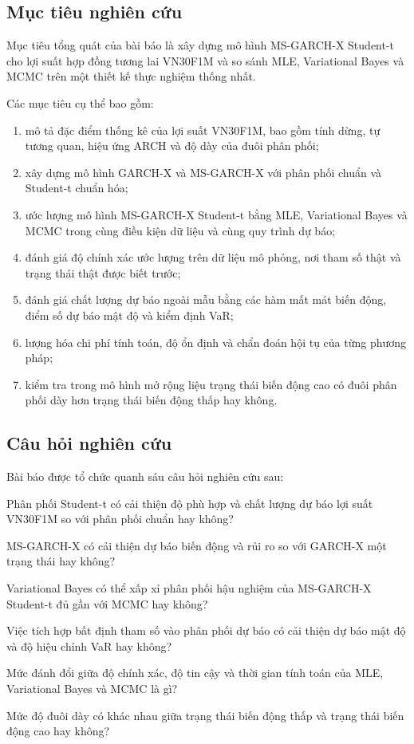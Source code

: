 \documentclass[12pt,a4paper]{article}
\numberwithin{equation}{section}
\newcommand{\RQ}[1]{\textbf{RQ#1}}
\begin{document}
\subsection{Mục tiêu nghiên cứu}\label{subsec:muc-tieu}

Mục tiêu tổng quát của bài báo là xây dựng mô hình MS-GARCH-X Student-t cho lợi suất hợp đồng tương lai VN30F1M và so sánh MLE, Variational Bayes và MCMC trên một thiết kế thực nghiệm thống nhất.

Các mục tiêu cụ thể bao gồm:
\begin{enumerate}
  \item mô tả đặc điểm thống kê của lợi suất VN30F1M, bao gồm tính dừng, tự tương quan, hiệu ứng ARCH và độ dày của đuôi phân phối;
  \item xây dựng mô hình GARCH-X và MS-GARCH-X với phân phối chuẩn và Student-t chuẩn hóa;
  \item ước lượng mô hình MS-GARCH-X Student-t bằng MLE, Variational Bayes và MCMC trong cùng điều kiện dữ liệu và cùng quy trình dự báo;
  \item đánh giá độ chính xác ước lượng trên dữ liệu mô phỏng, nơi tham số thật và trạng thái thật được biết trước;
  \item đánh giá chất lượng dự báo ngoài mẫu bằng các hàm mất mát biến động, điểm số dự báo mật độ và kiểm định VaR;
  \item lượng hóa chi phí tính toán, độ ổn định và chẩn đoán hội tụ của từng phương pháp;
  \item kiểm tra trong mô hình mở rộng liệu trạng thái biến động cao có đuôi phân phối dày hơn trạng thái biến động thấp hay không.
\end{enumerate}

\subsection{Câu hỏi nghiên cứu}\label{subsec:cau-hoi}

Bài báo được tổ chức quanh sáu câu hỏi nghiên cứu sau:

\begin{description}[style=nextline,leftmargin=1.7cm,labelwidth=1.3cm]
  \item[\RQ{1}.] Phân phối Student-t có cải thiện độ phù hợp và chất lượng dự báo lợi suất VN30F1M so với phân phối chuẩn hay không?
  \item[\RQ{2}.] MS-GARCH-X có cải thiện dự báo biến động và rủi ro so với GARCH-X một trạng thái hay không?
  \item[\RQ{3}.] Variational Bayes có thể xấp xỉ phân phối hậu nghiệm của MS-GARCH-X Student-t đủ gần với MCMC hay không?
  \item[\RQ{4}.] Việc tích hợp bất định tham số vào phân phối dự báo có cải thiện dự báo mật độ và độ hiệu chỉnh VaR hay không?
  \item[\RQ{5}.] Mức đánh đổi giữa độ chính xác, độ tin cậy và thời gian tính toán của MLE, Variational Bayes và MCMC là gì?
  \item[\RQ{6}.] Mức độ đuôi dày có khác nhau giữa trạng thái biến động thấp và trạng thái biến động cao hay không?
\end{description}
\end{document}

